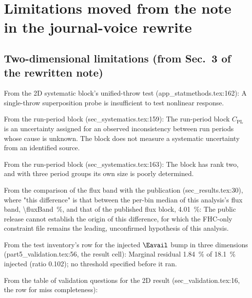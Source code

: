 \section{Limitations moved from the note in the journal-voice rewrite}

\subsection{Two-dimensional limitations (from Sec.~3 of the rewritten note)}
From the 2D systematic block's unified-throw test (app\_statmethods.tex:162):
A single-throw superposition probe is insufficient to test nonlinear response.

From the run-period block (sec\_systematics.tex:159):
The run-period block $C_{\mathrm{PL}}$ is an uncertainty assigned for an observed inconsistency between run periods whose cause is unknown. The block does not measure a systematic uncertainty from an identified source.

From the run-period block (sec\_systematics.tex:163):
The block has rank two, and with three period groups its own size is poorly determined.

From the comparison of the flux band with the publication (sec\_results.tex:30), where "this difference" is that between the per-bin median of this analysis's flux band, \SI{\fluxBand}{\percent}, and that of the published flux block, \SI{4.01}{\percent}:
The public release cannot establish the origin of this difference, for which the FHC-only constraint file remains the leading, unconfirmed hypothesis of this analysis.

From the test inventory's row for the injected $\Eavail$ bump in three dimensions (part5\_validation.tex:56, the result cell):
Marginal residual \SI{1.84}{\percent} of \SI{18.1}{\percent} injected (ratio 0.102); no threshold specified before it ran.

From the table of validation questions for the 2D result (sec\_validation.tex:16, the row for miss completeness):

